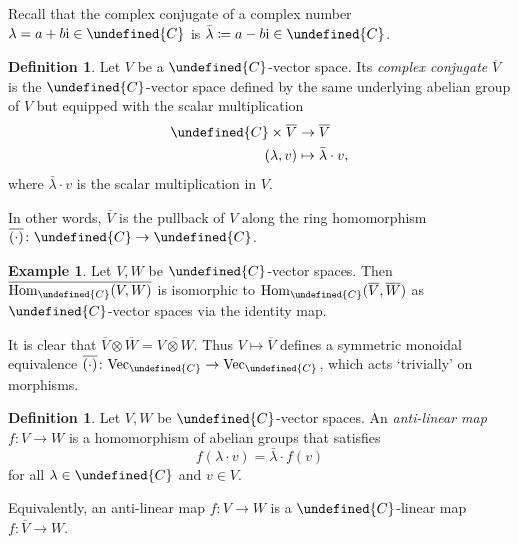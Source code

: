 \documentclass[10pt]{article}
\let\mathbb\undefined
\theoremstyle{definition}
\newtheorem{defn}[thm]{Definition}
\newtheorem{expl}[thm]{Example}
\newtheorem{rem}[thm]{Remark}
\numberwithin{equation}{section}
\numberwithin{thm}{section}
\newcommand{\Cb}{\mathbb{C}}
\DeclareMathOperator{\Hom}{Hom}
\newcommand{\vect}{\mathrm{Vec}}
\begin{document}
Recall that the complex conjugate of a complex number $\lambda = a + b \mathrm i \in \Cb$ is $\bar \lambda \coloneqq a - b \mathrm i \in \Cb$.

\begin{defn}
Let $V$ be a $\Cb$-vector space. Its \emph{complex conjugate} $\overline V$ is the $\Cb$-vector space defined by the same underlying abelian group of $V$ but equipped with the scalar multiplication
\begin{align*}
\Cb \times \overline V & \to \overline V \\
(\lambda , v) & \mapsto \bar \lambda \cdot v ,
\end{align*}
where $\bar \lambda \cdot v$ is the scalar multiplication in $V$.
\end{defn}

In other words, $\overline V$ is the pullback of $V$ along the ring homomorphism $\overline{(\cdot)} \colon \Cb \to \Cb$.

\begin{expl}
Let $V,W$ be $\Cb$-vector spaces. Then $\overline{\Hom_\Cb(V,W)}$ is isomorphic to $\Hom_\Cb(\overline V,\overline W)$ as $\Cb$-vector spaces via the identity map.
\end{expl}

It is clear that $\overline V \otimes \overline W = \overline{V \otimes W}$. Thus $V \mapsto \overline{V}$ defines a symmetric monoidal equivalence $\overline{( \cdot )} \colon \vect_\Cb \to \vect_\Cb$, which acts `trivially' on morphisms.


\begin{defn}
Let $V,W$ be $\Cb$-vector spaces. An \emph{anti-linear map} $f \colon V \to W$ is a homomorphism of abelian groups that satisfies
\[
f(\lambda \cdot v) = \bar \lambda \cdot f(v)
\]
for all $\lambda \in \Cb$ and $v \in V$.
\end{defn}

Equivalently, an anti-linear map $f \colon V \to W$ is a $\Cb$-linear map $f \colon \overline V \to W$.
\end{document}
